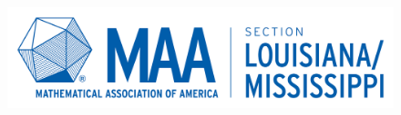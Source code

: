 \documentclass[10pt]{article} %
\begin{document}
\graphicspath{{../assets/img/}}

\begin{figure}[H]
  \centering\includegraphics[width=0.5\linewidth]{logo.png}
\end{figure}

\end{document}
